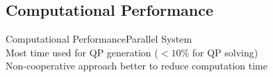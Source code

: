\subsection{Computational Performance}
\begin{frame}{Computational Performance}{Parallel System}
  {
    \centering
    \resizebox{!}{0.3\textheight}{
      \begin{minipage}{\linewidth}
        \begin{minipage}{\linewidth}
          
        \end{minipage}
        \\
        \begin{minipage}{\linewidth}
          
        \end{minipage}
      \end{minipage}
    }
    \resizebox{!}{0.3\textheight}{
      \begin{minipage}{\linewidth}
        \begin{minipage}{\linewidth}
          
        \end{minipage}
        \\
        \begin{minipage}{\linewidth}
          
        \end{minipage}
      \end{minipage}
    }
    \\
  }
  {
    \centering
    Most time used for QP generation ($< 10\%$ for QP solving)\\
    \alert{Non-cooperative approach better to reduce computation time}\\
  }
\end{frame}



